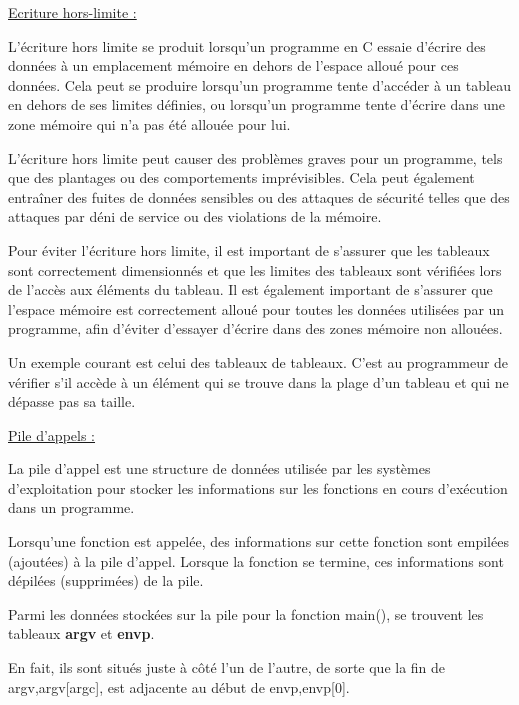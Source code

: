 \documentclass[12pt,a4paper]{article}
\begin{document}
\begin{flushleft}
            \underline{Ecriture hors-limite : }
                \item L'écriture hors limite se produit lorsqu'un programme en C essaie d'écrire des données à un emplacement mémoire en dehors de l'espace alloué pour ces données. Cela peut se produire lorsqu'un programme tente d'accéder à un tableau en dehors de ses limites définies, ou lorsqu'un programme tente d'écrire dans une zone mémoire qui n'a pas été allouée pour lui.
                \item L'écriture hors limite peut causer des problèmes graves pour un programme, tels que des plantages ou des comportements imprévisibles. Cela peut également entraîner des fuites de données sensibles ou des attaques de sécurité telles que des attaques par déni de service ou des violations de la mémoire.
                \item Pour éviter l'écriture hors limite, il est important de s'assurer que les tableaux sont correctement dimensionnés et que les limites des tableaux sont vérifiées lors de l'accès aux éléments du tableau. Il est également important de s'assurer que l'espace mémoire est correctement alloué pour toutes les données utilisées par un programme, afin d'éviter d'essayer d'écrire dans des zones mémoire non allouées.
                \item Un exemple courant est celui des tableaux de tableaux. C’est au programmeur de vérifier s’il accède à un élément qui se trouve dans la plage d’un tableau et qui ne dépasse pas sa taille.
            \item \underline{Pile d’appels :}
                 \item La pile d'appel est une structure de données utilisée par les systèmes d'exploitation pour stocker les informations sur les fonctions en cours d'exécution dans un programme. 
                 \item Lorsqu'une fonction est appelée, des informations sur cette fonction sont empilées (ajoutées) à la pile d'appel. Lorsque la fonction se termine, ces informations sont dépilées (supprimées) de la pile.
                \item Parmi les données stockées sur la pile pour la fonction main(), se trouvent les tableaux \textbf{argv} et \textbf{envp}.
                \item En fait, ils sont situés juste à côté l’un de l’autre, de sorte que la fin de argv,argv[argc], est adjacente au début de envp,envp[0].
                \begin{center}

\end{center}
\end{flushleft}
\end{document}
